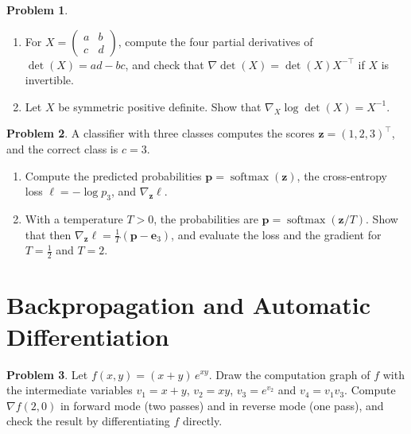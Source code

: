 \documentclass[11pt]{article}
\theoremstyle{definition}
\newtheorem{problem}{Problem}[section]
\DeclareMathOperator{\softmax}{softmax}
\begin{document}
\begin{problem}\label{pr:det-2x2}
    \begin{enumerate}[label=(\alph*)]
        \item For $X = \begin{pmatrix} a & b \\ c & d \end{pmatrix}$, compute the four partial derivatives of $\det(X) = ad - bc$, and check that $\nabla\det(X) = \det(X)X^{-\top}$ if $X$ is invertible.
        \item Let $X$ be symmetric positive definite. Show that $\nabla_X \log\det(X) = X^{-1}$.
    \end{enumerate}
\end{problem}

\begin{problem}\label{pr:softmax-temperature}
    A classifier with three classes computes the scores $\mathbf{z} = (1, 2, 3)^\top$, and the correct class is $c = 3$.
    \begin{enumerate}[label=(\alph*)]
        \item Compute the predicted probabilities $\mathbf{p} = \softmax(\mathbf{z})$, the cross-entropy loss $\ell = -\log p_3$, and $\nabla_{\mathbf{z}}\ell$.
        \item With a temperature $T > 0$, the probabilities are $\mathbf{p} = \softmax(\mathbf{z}/T)$. Show that then $\nabla_{\mathbf{z}}\ell = \frac{1}{T}(\mathbf{p} - \mathbf{e}_3)$, and evaluate the loss and the gradient for $T = \frac{1}{2}$ and $T = 2$.
    \end{enumerate}
\end{problem}

\section{Backpropagation and Automatic Differentiation}

\begin{problem}\label{pr:autodiff-graph}
    Let $f(x, y) = (x + y)\,e^{xy}$. Draw the computation graph of $f$ with the intermediate variables $v_1 = x + y$, $v_2 = xy$, $v_3 = e^{v_2}$ and $v_4 = v_1 v_3$. Compute $\nabla f(2, 0)$ in forward mode (two passes) and in reverse mode (one pass), and check the result by differentiating $f$ directly.
\end{problem}
\end{document}

